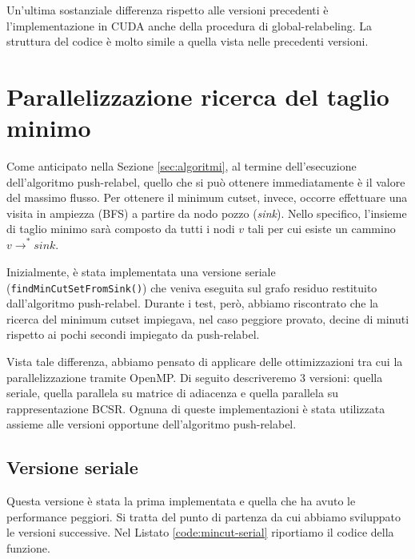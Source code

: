             Un'ultima sostanziale differenza rispetto alle versioni precedenti è l'implementazione in CUDA anche della procedura di global-relabeling. La struttura del codice è molto simile a quella vista nelle precedenti versioni.     

    \newpage

    \section{Parallelizzazione ricerca del taglio minimo}

        Come anticipato nella Sezione \ref{sec:algoritmi}, al termine dell'esecuzione dell'algoritmo push-relabel, quello che si può ottenere immediatamente è il valore del massimo flusso. Per ottenere il minimum cutset, invece, occorre effettuare una visita in ampiezza (BFS) a partire da nodo pozzo (\textit{sink}). Nello specifico, l'insieme di taglio minimo sarà composto da tutti i nodi $v$ tali per cui esiste un cammino $v \xrightarrow{}^* sink$.

        Inizialmente, è stata implementata una versione seriale (\verb|findMinCutSetFromSink()|) che veniva eseguita sul grafo residuo restituito dall'algoritmo push-relabel. Durante i test, però, abbiamo riscontrato che la ricerca del minimum cutset impiegava, nel caso peggiore provato, decine di minuti rispetto ai pochi secondi impiegato da push-relabel.

        Vista tale differenza, abbiamo pensato di applicare delle ottimizzazioni tra cui la parallelizzazione tramite OpenMP. Di seguito descriveremo 3 versioni: quella seriale, quella parallela su matrice di adiacenza e quella parallela su rappresentazione BCSR.
        Ognuna di queste implementazioni è stata utilizzata assieme alle versioni opportune dell'algoritmo push-relabel.

        \subsection{Versione seriale}

            Questa versione è stata la prima implementata e quella che ha avuto le performance peggiori. Si tratta del punto di partenza da cui abbiamo sviluppato le versioni successive.
            Nel Listato \ref{code:mincut-serial} riportiamo il codice della funzione.


